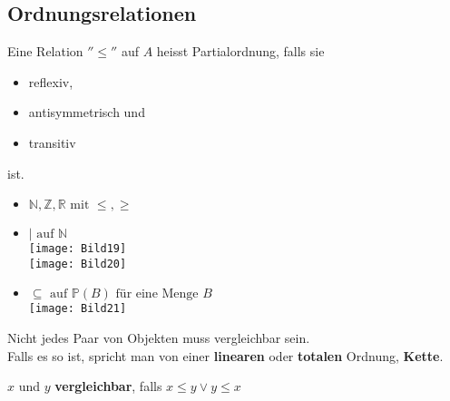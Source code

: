 \subsection{Ordnungsrelationen}
\begin{def*}[note = Partialordnung , index = Partialordnung]
	Eine Relation $''\leq''$ auf $A$ heisst Partialordnung, falls sie
	\begin{itemize}
		\item reflexiv,
		\item antisymmetrisch und
		\item transitiv
	\end{itemize}
	ist.
\end{def*}
\begin{bsp*}
	\begin{itemize}
		\item $\mathbb{N}, \mathbb{Z}, \mathbb{R} \text{ mit } \leq, \geq$
		\item $| \text{ auf } \mathbb{N}$ \\
			\texttt{[image: Bild19]} \\
			\texttt{[image: Bild20]}
		\item $\subseteq \text{ auf } \mathbb{P}( B ) \text{ für eine Menge } B$ \\
			\texttt{[image: Bild21]}
	\end{itemize}
\end{bsp*}
\begin{bem}
	Nicht jedes Paar von Objekten muss vergleichbar sein.\\
	Falls es so ist, spricht man von einer \textbf{linearen} oder \textbf{totalen} Ordnung, \textbf{Kette}.
\end{bem}
\begin{def*}[note = vergleichbar , index = vergleichbar]
	$x$ und $y$ \textbf{vergleichbar}, falls $x \leq y \vee y \leq x$
\end{def*}

